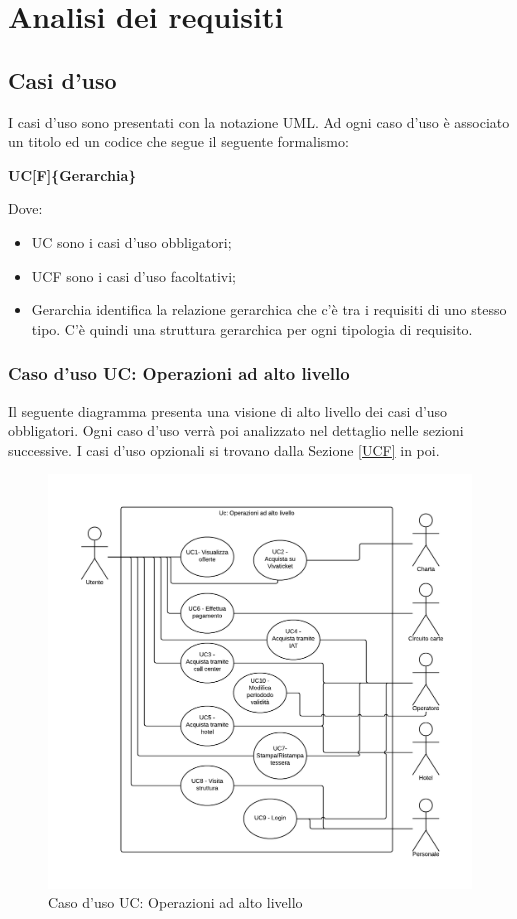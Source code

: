\section{Analisi dei requisiti}\label{analisideirequisiti}
\subsection{Casi d'uso}

I casi d'uso sono presentati con la notazione UML.
Ad ogni caso d'uso è associato un titolo ed un codice che segue il seguente formalismo:

\begin{center}
\textbf{UC[F]\{Gerarchia\}}
\end{center}

Dove:
\begin{itemize}
\item UC sono i casi d'uso obbligatori;
\item UCF sono i casi d'uso facoltativi;
\item Gerarchia identifica la relazione gerarchica che c'è tra i requisiti di uno stesso tipo. C'è quindi una struttura gerarchica per ogni tipologia di requisito.
\end{itemize}

\subsubsection{Caso d'uso UC: Operazioni ad alto livello}\label{UC}
Il seguente diagramma presenta una visione di alto livello dei casi d'uso obbligatori. Ogni caso d'uso verrà poi analizzato nel dettaglio nelle sezioni successive. I casi d'uso opzionali si trovano dalla Sezione \ref{UCF} in poi.

\begin{figure}[H]
\centering
\includegraphics[width=1\textwidth]{images/UC.png}
\caption{Caso d'uso UC: Operazioni ad alto livello}
\end{figure}

